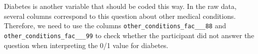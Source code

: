 \documentclass[
  letterpaper,
]{latex/krantz}
\makeatletter
\newenvironment{Shaded}{\begin{snugshade}}{\end{snugshade}}
\newcommand{\CommentTok}[1]{\textcolor[rgb]{0.37,0.37,0.37}{#1}}
\newcommand{\DecValTok}[1]{\textcolor[rgb]{0.68,0.00,0.00}{#1}}
\newcommand{\FunctionTok}[1]{\textcolor[rgb]{0.28,0.35,0.67}{#1}}
\newcommand{\NormalTok}[1]{\textcolor[rgb]{0.00,0.23,0.31}{#1}}
\newcommand{\OtherTok}[1]{\textcolor[rgb]{0.00,0.23,0.31}{#1}}
\newcommand{\SpecialCharTok}[1]{\textcolor[rgb]{0.37,0.37,0.37}{#1}}
\newcommand{\StringTok}[1]{\textcolor[rgb]{0.13,0.47,0.30}{#1}}
\newenvironment{kframe}{%
\medskip{}
\setlength{\fboxsep}{.8em}
 \def\at@end@of@kframe{}%
 \ifinner\ifhmode%
  \def\at@end@of@kframe{\end{minipage}}%
  \begin{minipage}{\columnwidth}%
 \fi\fi%
 \def\FrameCommand##1{\hskip\@totalleftmargin \hskip-\fboxsep
 \colorbox{shadecolor}{##1}\hskip-\fboxsep
     \hskip-\linewidth \hskip-\@totalleftmargin \hskip\columnwidth}%
 \MakeFramed {\advance\hsize-\width
   \@totalleftmargin\z@ \linewidth\hsize
   \@setminipage}}%
 {\par\unskip\endMakeFramed%
 \at@end@of@kframe}
\renewenvironment{Shaded}{\begin{kframe}}{\end{kframe}}
\makeatother
\begin{document}
\begin{Shaded}
\end{Shaded}

Diabetes is another variable that should be coded this way. In the raw
data, several columns correspond to this question about other medical
conditions. Therefore, we need to use the columns
\texttt{other\_conditions\_fac\_\_\_88} and
\texttt{other\_conditions\_fac\_\_\_99} to check whether the participant
did not answer the question when interpreting the 0/1 value for
diabetes.
\end{document}
